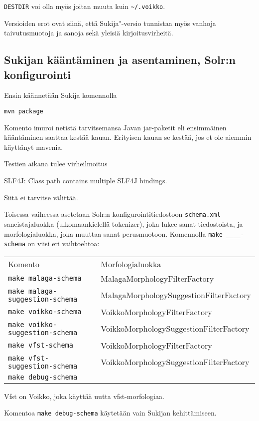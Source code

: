\documentclass[12pt,a4paper]{scrartcl}
\begin{document}
\verb|DESTDIR| voi olla myös joitan muuta kuin \verb|~/.voikko|.

Versioiden erot ovat siinä, että Sukija"-versio tunnistaa myös vanhoja
taivutusmuotoja ja sanoja sekä yleisiä kirjoitusvirheitä.


\subsection*{Sukijan kääntäminen ja asentaminen, Solr:n konfigurointi}

Ensin käännetään Sukija komennolla

\verb=mvn package=

Komento imuroi netistä tarvitsemansa Javan jar-paketit eli ensimmäinen
kääntäminen saattaa kestää kauan. Erityisen kauan se kestää, jos et
ole aiemmin käyttänyt mavenia.

Testien aikana tulee virheilmoitus

SLF4J: Class path contains multiple SLF4J bindings.

Siitä ei tarvitse välittää.

\bigskip Toisessa vaiheessa asetetaan Solr:n konfigurointitiedostoon
\verb=schema.xml= saneistajaluokka (ulkomaankielellä tokenizer), joka
lukee sanat tiedostoista, ja morfologialuokka, joka muuttaa sanat
perusmuotoon. Komennolla \verb|make ____-schema| on viisi eri
vaihtoehtoa:

\begin{tabular}{@{}ll}
Komento                              & Morfologialuokka \\
\verb=make malaga-schema=            & MalagaMorphologyFilterFactory \\
\verb=make malaga-suggestion-schema= & MalagaMorphologySuggestionFilterFactory \\
\verb=make voikko-schema=            & VoikkoMorphologyFilterFactory \\
\verb=make voikko-suggestion-schema= & VoikkoMorphologySuggestionFilterFactory \\
\verb=make vfst-schema=              & VoikkoMorphologyFilterFactory \\
\verb=make vfst-suggestion-schema=   & VoikkoMorphologySuggestionFilterFactory \\
\verb=make debug-schema=             &
\end{tabular}

Vfst on Voikko, joka käyttää uutta vfst-morfologiaa.

Komentoa \verb=make debug-schema= käytetään vain Sukijan
kehittämiseen.
\end{document}
